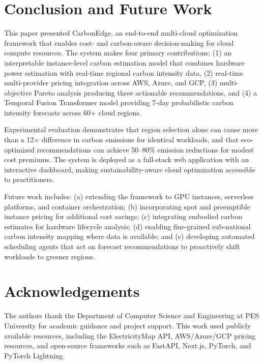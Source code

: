 \documentclass[12pt]{article}
\begin{document}
\section{Conclusion and Future Work}

This paper presented CarbonEdge, an end-to-end multi-cloud optimization framework that enables cost- and carbon-aware decision-making for cloud compute resources. The system makes four primary contributions: (1) an interpretable instance-level carbon estimation model that combines hardware power estimation with real-time regional carbon intensity data, (2) real-time multi-provider pricing integration across AWS, Azure, and GCP, (3) multi-objective Pareto analysis producing three actionable recommendations, and (4) a Temporal Fusion Transformer model providing 7-day probabilistic carbon intensity forecasts across 60+ cloud regions.

Experimental evaluation demonstrates that region selection alone can cause more than a 12$\times$ difference in carbon emissions for identical workloads, and that eco-optimized recommendations can achieve 50--80\% emission reductions for modest cost premiums. The system is deployed as a full-stack web application with an interactive dashboard, making sustainability-aware cloud optimization accessible to practitioners.

Future work includes: (a) extending the framework to GPU instances, serverless platforms, and container orchestration; (b) incorporating spot and preemptible instance pricing for additional cost savings; (c) integrating embodied carbon estimates for hardware lifecycle analysis; (d) enabling fine-grained sub-national carbon intensity mapping where data is available; and (e) developing automated scheduling agents that act on forecast recommendations to proactively shift workloads to greener regions.

\section*{Acknowledgements}

The authors thank the Department of Computer Science and Engineering at PES University for academic guidance and project support. This work used publicly available resources, including the ElectricityMap API, AWS/Azure/GCP pricing resources, and open-source frameworks such as FastAPI, Next.js, PyTorch, and PyTorch Lightning.
\end{document}
